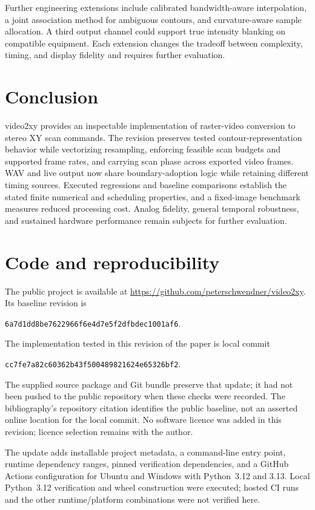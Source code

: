 \documentclass[11pt,a4paper]{article}
\newcommand{\code}[1]{\texttt{#1}}
\begin{document}
Further engineering extensions include calibrated bandwidth-aware interpolation, a joint association method for ambiguous contours, and curvature-aware sample allocation. A third output channel could support true intensity blanking on compatible equipment. Each extension changes the tradeoff between complexity, timing, and display fidelity and requires further evaluation.

\section{Conclusion}
video2xy provides an inspectable implementation of raster-video conversion to stereo XY scan commands. The revision preserves tested contour-representation behavior while vectorizing resampling, enforcing feasible scan budgets and supported frame rates, and carrying scan phase across exported video frames. WAV and live output now share boundary-adoption logic while retaining different timing sources. Executed regressions and baseline comparisons establish the stated finite numerical and scheduling properties, and a fixed-image benchmark measures reduced processing cost. Analog fidelity, general temporal robustness, and sustained hardware performance remain subjects for further evaluation.

\section{Code and reproducibility}\label{sec:repro}
The public project is available at \url{https://github.com/peterschwendner/video2xy}. Its baseline revision is
\begin{center}\small\code{6a7d1dd8be7622966f6e4d7e5f2dfbdec1001af6}.\end{center}
The implementation tested in this revision of the paper is local commit
\begin{center}\small\code{cc7fe7a82c60362b43f500489821624e65326bf2}.\end{center}
The supplied source package and Git bundle preserve that update; it had not been pushed to the public repository when these checks were recorded. The bibliography's repository citation identifies the public baseline, not an asserted online location for the local commit. No software licence was added in this revision; licence selection remains with the author.

The update adds installable project metadata, a command-line entry point, runtime dependency ranges, pinned verification dependencies, and a GitHub Actions configuration for Ubuntu and Windows with Python~3.12 and 3.13. Local Python~3.12 verification and wheel construction were executed; hosted CI runs and the other runtime/platform combinations were not verified here.
\end{document}
